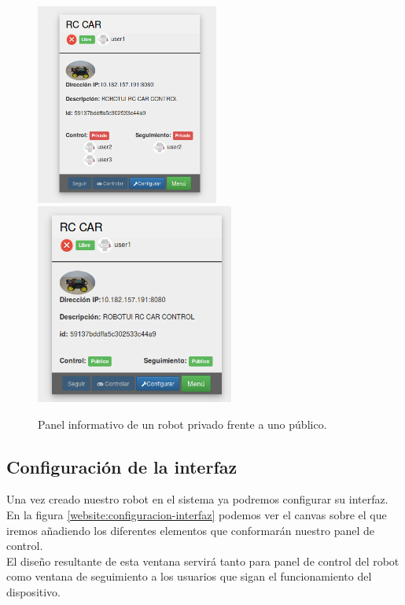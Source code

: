 \begin{figure}[H]
    \centering
    \includegraphics[width=6cm]{imagenes/manual-usuario/robot-privado.png}
    \qquad
    \includegraphics[width=6.5cm]{imagenes/manual-usuario/robot-publico.png}
    \caption{Panel informativo de un robot privado frente a uno público.}%
    \label{fig:http-request}%
\end{figure}


\subsection{Configuración de la interfaz}
\label{subsec:configuracion-interfaz}

Una vez creado nuestro robot en el sistema ya podremos configurar su interfaz. En la figura \ref{website:configuracion-interfaz} podemos ver el canvas sobre el que iremos añadiendo los diferentes elementos que 
conformarán nuestro panel de control. \\

El diseño resultante de esta ventana servirá tanto para panel de control del robot como ventana de seguimiento a los usuarios que sigan el funcionamiento del
dispositivo.\\

